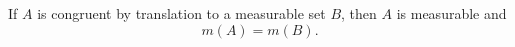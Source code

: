 \begin{theorem}[Theorem 3.19]
If $A$ is congruent by translation to a measurable set $B$, then $A$ is measurable and
$$
m(A) = m(B).
$$
\end{theorem}
